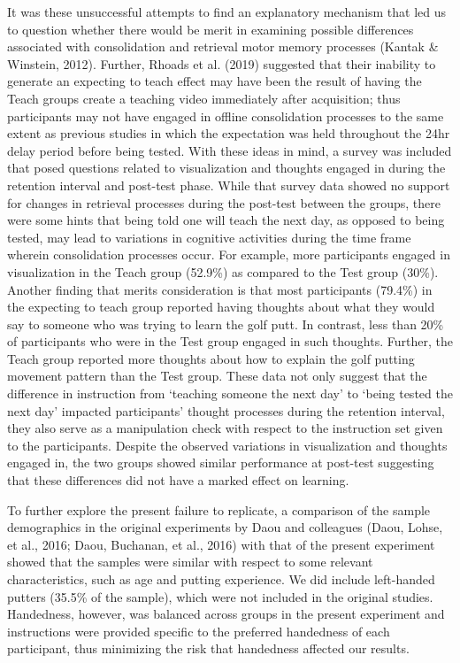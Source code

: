 \documentclass[
  english,
  man,floatsintext]{apa7}
\begin{document}
It was these unsuccessful attempts to find an explanatory mechanism that led us to question whether there would be merit in examining possible differences associated with consolidation and retrieval motor memory processes (Kantak \& Winstein, 2012). Further, Rhoads et al. (2019) suggested that their inability to generate an expecting to teach effect may have been the result of having the Teach groups create a teaching video immediately after acquisition; thus participants may not have engaged in offline consolidation processes to the same extent as previous studies in which the expectation was held throughout the 24hr delay period before being tested. With these ideas in mind, a survey was included that posed questions related to visualization and thoughts engaged in during the retention interval and post-test phase. While that survey data showed no support for changes in retrieval processes during the post-test between the groups, there were some hints that being told one will teach the next day, as opposed to being tested, may lead to variations in cognitive activities during the time frame wherein consolidation processes occur. For example, more participants engaged in visualization in the Teach group (52.9\%) as compared to the Test group (30\%). Another finding that merits consideration is that most participants (79.4\%) in the expecting to teach group reported having thoughts about what they would say to someone who was trying to learn the golf putt. In contrast, less than 20\% of participants who were in the Test group engaged in such thoughts. Further, the Teach group reported more thoughts about how to explain the golf putting movement pattern than the Test group. These data not only suggest that the difference in instruction from `teaching someone the next day' to `being tested the next day' impacted participants' thought processes during the retention interval, they also serve as a manipulation check with respect to the instruction set given to the participants. Despite the observed variations in visualization and thoughts engaged in, the two groups showed similar performance at post-test suggesting that these differences did not have a marked effect on learning.

To further explore the present failure to replicate, a comparison of the sample demographics in the original experiments by Daou and colleagues (Daou, Lohse, et al., 2016; Daou, Buchanan, et al., 2016) with that of the present experiment showed that the samples were similar with respect to some relevant characteristics, such as age and putting experience. We did include left-handed putters (35.5\% of the sample), which were not included in the original studies. Handedness, however, was balanced across groups in the present experiment and instructions were provided specific to the preferred handedness of each participant, thus minimizing the risk that handedness affected our results.
\end{document}
